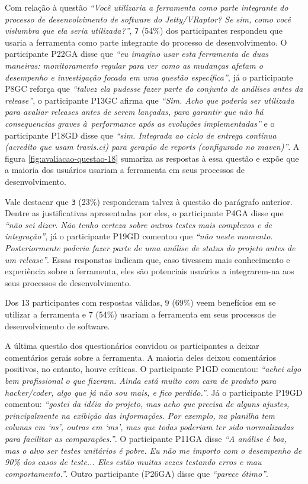 Com relação à questão \textit{``Você utilizaria a ferramenta como parte integrante do processo de desenvolvimento de software do Jetty/VRaptor? Se sim, como você vislumbra que ela seria utilizada?''}, \texttt{7} (54\%) dos participantes respondeu que usaria a ferramenta como parte integrante do processo de desenvolvimento. O participante P22GA disse que \textit{``eu imagino usar esta ferramenta de duas maneiras: monitoramento regular para ver como as mudanças afetam o desempenho e investigação focada em uma questão específica''}, já o participante P8GC reforça que \textit{``talvez ela pudesse fazer parte do conjunto de análises antes da release''}, o participante P13GC afirma que \textit{``Sim. Acho que poderia ser utilizada para avaliar releases antes de serem lançadas, para garantir que não há consequencias graves à performance após as evoluções implementadas''} e o participante P18GD disse que \textit{``sim. Integrada ao ciclo de entrega continua (acredito que usam travis.ci) para geração de reports (configurado no maven)''}. A figura \ref{fig:avaliacao-questao-18} sumariza as respostas à essa questão e expõe que a maioria dos usuários usariam a ferramenta em seus processos de desenvolvimento.

Vale destacar que \texttt{3} (23\%) responderam talvez à questão do parágrafo anterior. Dentre as justificativas apresentadas por eles, o participante P4GA disse que \textit{``não sei dizer. Não tenho certeza sobre outros testes mais complexos e de integração''}, já o participante P19GD comentou que \textit{``não neste momento. Posteriormente poderia fazer parte de uma análise de status do projeto antes de um release''}. Essas responstas indicam que, caso tivessem mais conhecimento e experiência sobre a ferramenta, eles são potenciais usuários a integrarem-na aos seus processos de desenvolvimento.

\begin{framed}
  \noindent Dos 13 participantes com respostas válidas, 9 (69\%) veem benefícios em se utilizar a ferramenta e 7 (54\%) usariam a ferramenta em seus processos de desenvolvimento de software.
\end{framed}

A última questão dos questionários convidou os participantes a deixar comentários gerais sobre a ferramenta. A maioria deles deixou comentários positivos, no entanto, houve críticas. O participante P1GD comentou: \textit{``achei algo bem profissional o que fizeram. Ainda está muito com cara de produto para hacker/coder, algo que já não sou mais, e fico perdido.''}. Já o participante P19GD comentou: \textit{``gostei da idéia do projeto, mas acho que precisa de alguns ajustes, principalmente na exibição das informações. Por exemplo, na planilha tem colunas em `ns', outras em `ms', mas que todas poderiam ter sido normalizadas para facilitar as comparações.''}. O participante P11GA disse \textit{``A análise é boa, mas o alvo ser testes unitários é pobre. Eu não me importo com o desempenho de 90\% dos casos de teste... Eles estão muitas vezes testando erros e mau comportamento.''}. Outro participante (P26GA) disse que \textit{``parece ótimo''}.

